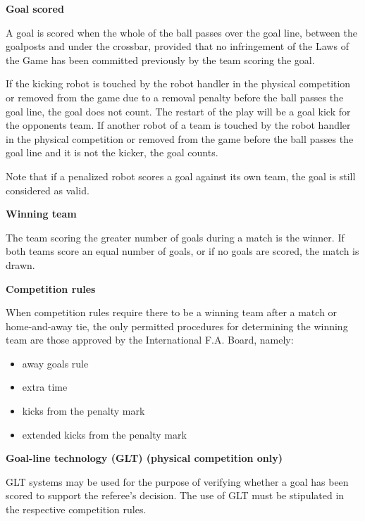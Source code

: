 \clearpage
\sffamily
{\bfseries\color[rgb]{0.4,0.4,0.4}{Law 10 -- The Method of Scoring} }
{}

\bigskip

{\bfseries Goal scored }

\headlinebox

A goal is scored when the whole of the ball passes over the goal line,
between the goalposts and under the crossbar,
provided that no infringement of the Laws of the Game has been committed
previously by the team scoring the goal.

\bigskip

If the kicking robot is touched by the robot handler in the physical competition or removed from the game due to a removal penalty before the ball passes the goal line,
the goal does not count.
The restart of the play will be a goal kick for the opponents team.
If another robot of a team is touched by the robot handler in the physical competition or removed from the game before the ball
passes the goal line and it is not the kicker, the goal counts.

\bigskip

Note that if a penalized robot scores a goal against its own team, the
  goal is still considered as valid.

\bigskip

{\bfseries Winning team}

\headlinebox

The team scoring the greater number of goals during a match is the winner. If both teams score an equal number of goals, or if no goals are scored, the match is drawn. 

\bigskip

{\bfseries Competition rules }

\headlinebox

When competition rules require there to be a winning team after a match or home-and-away tie, the only permitted procedures for determining the winning team are those approved by the International F.A. Board, namely:

\begin{itemize}
\item away goals rule
\item extra time
\item kicks from the penalty mark
\item {}extended kicks from the penalty mark
\end{itemize}


{\bfseries Goal-line technology (GLT) (physical competition only) }

\headlinebox

GLT systems may be used for the purpose of verifying whether a goal has been scored to support the referee{\textquoteright}s decision. The use of GLT must be stipulated in the respective competition rules.
